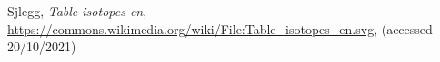 \documentclass[fleqn]{NotesClass}
\begin{document}
    
    \backmatter
    \begin{thebibliography}{9}
         Sjlegg, \textit{Table isotopes en}, \url{https://commons.wikimedia.org/wiki/File:Table_isotopes_en.svg}, (accessed 20/10/2021)
    \end{thebibliography}
    \renewcommand{\glossaryname}{Acronyms}
    \printglossary[acronym]
    \printindex
\end{document}
